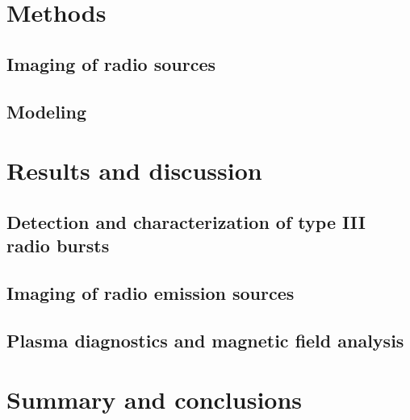 \section{Methods}

\subsection{Imaging of radio sources}

\subsection{Modeling}


\section{Results and discussion}

\subsection{Detection and characterization of type III radio bursts}

\subsection{Imaging of radio emission sources}

\subsection{Plasma diagnostics and magnetic field analysis}


\section{Summary and conclusions}


